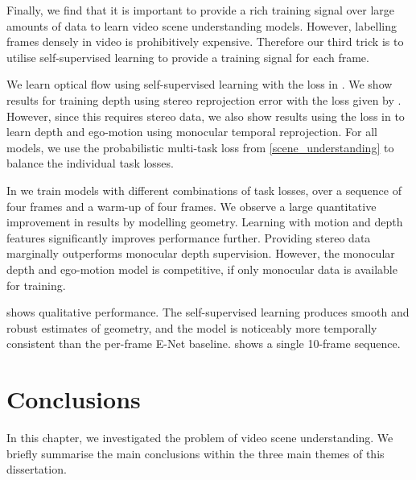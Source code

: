 Finally, we find that it is important to provide a rich training signal over large amounts of data to learn video scene understanding models. However, labelling frames densely in video is prohibitively expensive. Therefore our third trick is to utilise self-supervised learning to provide a training signal for each frame.

We learn optical flow using self-supervised learning with the loss in . We show results for training depth using stereo reprojection error with the loss given by . However, since this requires stereo data, we also show results using the loss in  to learn depth and ego-motion using monocular temporal reprojection. For all models, we use the probabilistic multi-task loss from \cref{scene_understanding} to balance the individual task losses.

In  we train models with different combinations of task losses, over a sequence of four frames and a warm-up of four frames. We observe a large quantitative improvement in results by modelling geometry. Learning with motion and depth features significantly improves performance further. Providing stereo data marginally outperforms monocular depth supervision. However, the monocular depth and ego-motion model is competitive, if only monocular data is available for training. 

 shows qualitative performance. The self-supervised learning produces smooth and robust estimates of geometry, and the model is noticeably more temporally consistent than the per-frame E-Net baseline.  shows a single 10-frame sequence.


\section{Conclusions}

In this chapter, we investigated the problem of video scene understanding. We briefly summarise the main conclusions within the three main themes of this dissertation.

